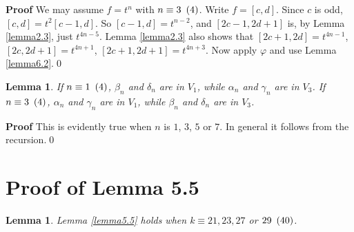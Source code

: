 \documentclass{monsky2009}
\newenvironment{proof}[1][]{\textbf{Proof #1\hspace{.3em}}}{}
\newtheorem{lemma}[definition]{Lemma}
\newcommand{\mod}[1]{\ensuremath{\hspace{.5em}(#1)}}
\begin{document}
\begin{proof}
We may assume $f=t^{n}$ with $n\equiv 3\mod{4}$. Write $f=[c,d]$. Since $c$ is odd, $[c,d]=t^{2}[c-1,d]$. So $[c-1,d]=t^{n-2}$, and $[2c-1,2d+1]$ is, by Lemma \ref{lemma2.3}, just $t^{4n-5}$. Lemma \ref{lemma2.3} also shows that $[2c+1,2d]=t^{4n-1}$, $[2c,2d+1]=t^{4n+1}$, $[2c+1,2d+1]=t^{4n+3}$. Now apply $\varphi$ and use Lemma \ref{lemma6.2}.\qed
\end{proof}

\begin{lemma}%
\label{lemma6.7}
If $n\equiv 1\mod{4}$, $\beta_{n}$ and $\delta_{n}$ are in $V_{1}$, while $\alpha_{n}$ and $\gamma_{n}$ are in $V_{3}$.  If $n\equiv 3\mod{4}$, $\alpha_{n}$ and $\gamma_{n}$ are in $V_{1}$, while $\beta_{n}$ and $\delta_{n}$ are in $V_{3}$.
\end{lemma}

\begin{proof}
This is evidently true when $n$ is $1$, $3$, $5$ or $7$. In general it follows from the recursion.\qed
\end{proof}

\section{Proof of Lemma 5.5}
\label{section7}

\begin{lemma}%
\label{lemma7.1}
Lemma \ref{lemma5.5} holds when $k\equiv 21, 23, 27$ or $29\mod{40}$.
\end{lemma}
\end{document}
